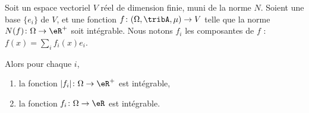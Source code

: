 \begin{lemma}        \label{LEMooCVHDooLJASAs}
	Soit un espace vectoriel \( V\) réel de dimension finie, muni de la norme \( N\). Soient une base \( \{ e_i \}\) de \( V\), et une fonction \( f\colon (\Omega,\tribA,\mu)\to V\) telle que la norme \( N(f)\colon \Omega\to \eR^+\) soit intégrable. Nous notons \( f_i\) les composantes de \( f\) : \( f(x)=\sum_if_i(x)e_i\).

	Alors pour chaque \( i\),
	\begin{enumerate}
		\item
		      la fonction \( | f_i |\colon \Omega\to \eR^+\) est intégrable,
		\item
		      la fonction \( f_i\colon \Omega\to \eR\) est intégrable.
	\end{enumerate}
\end{lemma}

